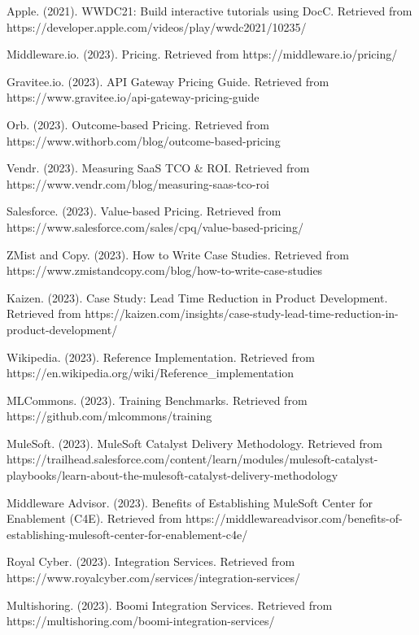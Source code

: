 \documentclass[11pt,a4paper]{article}
\begin{document}
\begin{thebibliography}{99}
 Apple. (2021). WWDC21: Build interactive tutorials using DocC. Retrieved from https://developer.apple.com/videos/play/wwdc2021/10235/

 Middleware.io. (2023). Pricing. Retrieved from https://middleware.io/pricing/

 Gravitee.io. (2023). API Gateway Pricing Guide. Retrieved from https://www.gravitee.io/api-gateway-pricing-guide

 Orb. (2023). Outcome-based Pricing. Retrieved from https://www.withorb.com/blog/outcome-based-pricing

 Vendr. (2023). Measuring SaaS TCO \& ROI. Retrieved from https://www.vendr.com/blog/measuring-saas-tco-roi

 Salesforce. (2023). Value-based Pricing. Retrieved from https://www.salesforce.com/sales/cpq/value-based-pricing/

 ZMist and Copy. (2023). How to Write Case Studies. Retrieved from https://www.zmistandcopy.com/blog/how-to-write-case-studies

 Kaizen. (2023). Case Study: Lead Time Reduction in Product Development. Retrieved from https://kaizen.com/insights/case-study-lead-time-reduction-in-product-development/

 Wikipedia. (2023). Reference Implementation. Retrieved from https://en.wikipedia.org/wiki/Reference\_implementation

 MLCommons. (2023). Training Benchmarks. Retrieved from https://github.com/mlcommons/training

 MuleSoft. (2023). MuleSoft Catalyst Delivery Methodology. Retrieved from https://trailhead.salesforce.com/content/learn/modules/mulesoft-catalyst-playbooks/learn-about-the-mulesoft-catalyst-delivery-methodology

 Middleware Advisor. (2023). Benefits of Establishing MuleSoft Center for Enablement (C4E). Retrieved from https://middlewareadvisor.com/benefits-of-establishing-mulesoft-center-for-enablement-c4e/

 Royal Cyber. (2023). Integration Services. Retrieved from https://www.royalcyber.com/services/integration-services/

 Multishoring. (2023). Boomi Integration Services. Retrieved from https://multishoring.com/boomi-integration-services/

\end{thebibliography}



\end{document}
